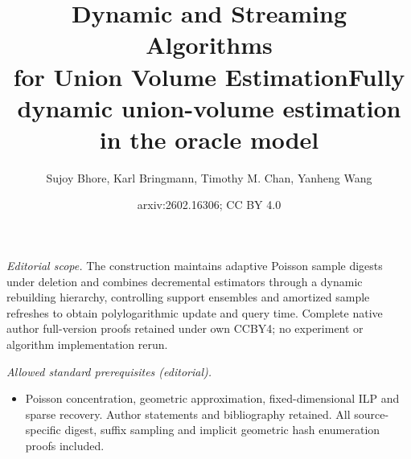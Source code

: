 \documentclass[11pt]{article}
\title{Dynamic and Streaming Algorithms\\for Union Volume Estimation}
\title{Fully dynamic union-volume estimation in the oracle model}
\author{Sujoy Bhore, Karl Bringmann, Timothy M. Chan, Yanheng Wang}
\date{arxiv:2602.16306; CC BY 4.0}
\begin{document}
\maketitle
\noindent\textit{Editorial scope.} The construction maintains adaptive Poisson sample digests under deletion and combines decremental estimators through a dynamic rebuilding hierarchy, controlling support ensembles and amortized sample refreshes to obtain polylogarithmic update and query time. Complete native author full-version proofs retained under own CCBY4; no experiment or algorithm implementation rerun.\par\medskip
\noindent\textit{Allowed standard prerequisites (editorial).}\begin{itemize}
\item Poisson concentration, geometric approximation, fixed-dimensional ILP and sparse recovery. Author statements and bibliography retained. All source-specific digest, suffix sampling and implicit geometric hash enumeration proofs included.
\end{itemize}\medskip
\end{document}
